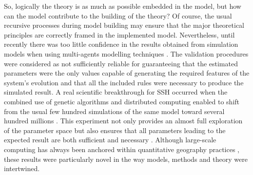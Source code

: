 \documentclass[10pt]{article}
\begin{document}
So, logically the theory is as much as possible embedded in the model, but how can the model contribute to the building of the theory? Of course, the usual recursive processes during model building may ensure that the major theoretical principles are correctly framed in the implemented model. Nevertheless, until recently there was too little confidence in the results obtained from simulation models when using multi-agents modelling techniques \citep{rey2015plateforme}. The validation procedures were considered as not sufficiently reliable for guaranteeing that the estimated parameters were the only values capable of generating the required features of the system’s evolution and that all the included rules were necessary to produce the simulated result. A real scientific breakthrough for SSH occurred when the combined use of genetic algorithms and distributed computing enabled to shift from the usual few hundred simulations of the same model toward several hundred millions \citep{schmitt2015half}. This experiment not only provides an almost full exploration of the parameter space but also ensures that all parameters leading to the expected result are both sufficient and necessary \citep{reuillon2015new,raimbault2019methods}. Although large-scale computing has always been anchored within quantitative geography practices \citep{rey2019calcul}, these results were particularly novel in the way models, methods and theory were intertwined.
\end{document}
